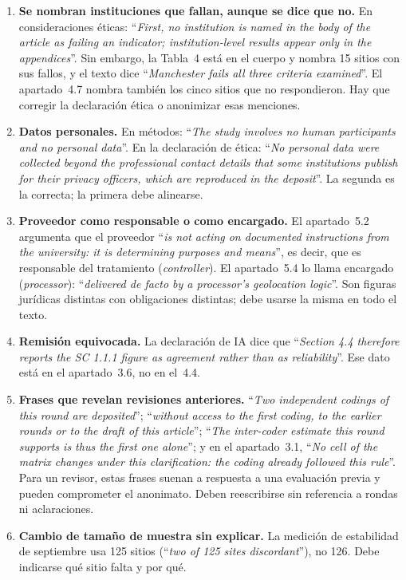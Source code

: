 \documentclass[11pt,a4paper]{article}
\newcommand{\cita}[1]{``\textit{#1}''}
\begin{document}
\begin{enumerate}
	\item \textbf{Se nombran instituciones que fallan, aunque se dice que no.} En consideraciones \'eticas: \cita{First, no institution is named in the body of the article as failing an indicator; institution-level results appear only in the appendices}. Sin embargo, la Tabla~4 est\'a en el cuerpo y nombra 15 sitios con sus fallos, y el texto dice \cita{Manchester fails all three criteria examined}. El apartado~4.7 nombra tambi\'en los cinco sitios que no respondieron. Hay que corregir la declaraci\'on \'etica o anonimizar esas menciones.
	\item \textbf{Datos personales.} En m\'etodos: \cita{The study involves no human participants and no personal data}. En la declaraci\'on de \'etica: \cita{No personal data were collected beyond the professional contact details that some institutions publish for their privacy officers, which are reproduced in the deposit}. La segunda es la correcta; la primera debe alinearse.
	\item \textbf{Proveedor como responsable o como encargado.} El apartado~5.2 argumenta que el proveedor \cita{is not acting on documented instructions from the university: it is determining purposes and means}, es decir, que es responsable del tratamiento (\emph{controller}). El apartado~5.4 lo llama encargado (\emph{processor}): \cita{delivered de facto by a processor's geolocation logic}. Son figuras jur\'idicas distintas con obligaciones distintas; debe usarse la misma en todo el texto.
	\item \textbf{Remisi\'on equivocada.} La declaraci\'on de IA dice que \cita{Section 4.4 therefore reports the SC 1.1.1 figure as agreement rather than as reliability}. Ese dato est\'a en el apartado~3.6, no en el~4.4.
	\item \textbf{Frases que revelan revisiones anteriores.} \cita{Two independent codings of this round are deposited}; \cita{without access to the first coding, to the earlier rounds or to the draft of this article}; \cita{The inter-coder estimate this round supports is thus the first one alone}; y en el apartado~3.1, \cita{No cell of the matrix changes under this clarification: the coding already followed this rule}. Para un revisor, estas frases suenan a respuesta a una evaluaci\'on previa y pueden comprometer el anonimato. Deben reescribirse sin referencia a rondas ni aclaraciones.
	\item \textbf{Cambio de tama\~no de muestra sin explicar.} La medici\'on de estabilidad de septiembre usa 125 sitios (\cita{two of 125 sites discordant}), no 126. Debe indicarse qu\'e sitio falta y por qu\'e.

\end{enumerate}
\end{document}
